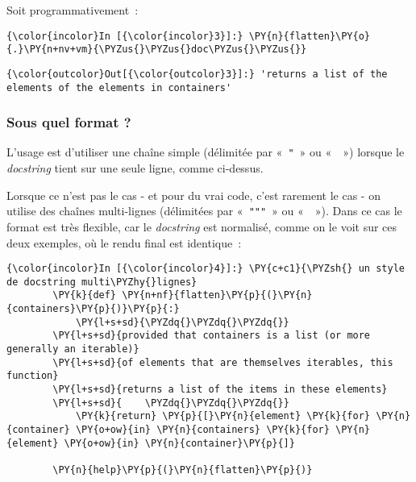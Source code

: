     Soit programmativement~:

    \begin{Verbatim}[commandchars=\\\{\}]
{\color{incolor}In [{\color{incolor}3}]:} \PY{n}{flatten}\PY{o}{.}\PY{n+nv+vm}{\PYZus{}\PYZus{}doc\PYZus{}\PYZus{}}
\end{Verbatim}


\begin{Verbatim}[commandchars=\\\{\}]
{\color{outcolor}Out[{\color{outcolor}3}]:} 'returns a list of the elements of the elements in containers'
\end{Verbatim}
            
    \hypertarget{sous-quel-format}{%
\subsubsection{Sous quel format ?}\label{sous-quel-format}}

    L'usage est d'utiliser une chaîne simple (délimitée par «~\texttt{"}~»
ou «~\texttt{\textquotesingle{}}~») lorsque le \emph{docstring} tient
sur une seule ligne, comme ci-dessus.

    Lorsque ce n'est pas le cas - et pour du vrai code, c'est rarement le
cas - on utilise des chaînes multi-lignes (délimitées par
«~\texttt{"""}~» ou
«~\texttt{\textquotesingle{}\textquotesingle{}\textquotesingle{}}~»).
Dans ce cas le format est très flexible, car le \emph{docstring} est
normalisé, comme on le voit sur ces deux exemples, où le rendu final est
identique~:

    \begin{Verbatim}[commandchars=\\\{\}]
{\color{incolor}In [{\color{incolor}4}]:} \PY{c+c1}{\PYZsh{} un style de docstring multi\PYZhy{}lignes}
        \PY{k}{def} \PY{n+nf}{flatten}\PY{p}{(}\PY{n}{containers}\PY{p}{)}\PY{p}{:}
            \PY{l+s+sd}{\PYZdq{}\PYZdq{}\PYZdq{}}
        \PY{l+s+sd}{provided that containers is a list (or more generally an iterable)}
        \PY{l+s+sd}{of elements that are themselves iterables, this function}
        \PY{l+s+sd}{returns a list of the items in these elements}
        \PY{l+s+sd}{    \PYZdq{}\PYZdq{}\PYZdq{}}
            \PY{k}{return} \PY{p}{[}\PY{n}{element} \PY{k}{for} \PY{n}{container} \PY{o+ow}{in} \PY{n}{containers} \PY{k}{for} \PY{n}{element} \PY{o+ow}{in} \PY{n}{container}\PY{p}{]}
        
        \PY{n}{help}\PY{p}{(}\PY{n}{flatten}\PY{p}{)}
\end{Verbatim}


